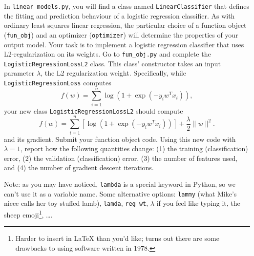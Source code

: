 \documentclass{article}
\newcommand{\blu}[1]{{\textcolor{blu}{#1}}}
\let\ask\blu
\newcommand{\norm}[1]{\lVert #1 \rVert}
\begin{document}
In \verb|linear_models.py|, you will find a class named \verb|LinearClassifier| that defines the fitting and prediction behaviour of a logistic regression classifier. As with ordinary least squares linear regression, the particular choice of a function object (\verb|fun_obj|) and an optimizer (\verb|optimizer|) will determine the properties of your output model.
Your task is to implement a logistic regression classifier that uses L2-regularization on its weights. Go to \verb|fun_obj.py| and complete the \verb|LogisticRegressionLossL2| class. This class' constructor takes an input parameter $\lambda$, the L2 regularization weight. Specifically, while \verb|LogisticRegressionLoss| computes
\[
f(w) = \sum_{i=1}^n \log(1+\exp(-y_iw^Tx_i)),
\]
your new class \verb|LogisticRegressionLossL2| should compute
\[
f(w) = \sum_{i=1}^n \left[\log(1+\exp(-y_iw^Tx_i))\right] + \frac{\lambda}{2}\norm{w}^2.
\]
and its gradient.
\ask{Submit your function object code. Using this new code with $\lambda = 1$, report how the following quantities change: (1) the training (classification) error, (2) the validation (classification) error, (3) the number of features used, and (4) the number of gradient descent iterations.}

Note: as you may have noticed, \verb|lambda| is a special keyword in Python, so we can't use it as a variable name.
Some alternative options:
\verb|lammy| (what Mike's niece calls her toy stuffed lamb),
\verb|lamda|,
\verb|reg_wt|,
$\lambda$ if you feel like typing it,
the sheep emoji\footnote{Harder to insert in \LaTeX{} than you'd like; turns out there are some drawbacks to using software written in 1978.},
\dots.
\end{document}

